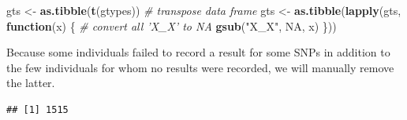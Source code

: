 \documentclass[]{article}
\newenvironment{Shaded}{\begin{snugshade}}{\end{snugshade}}
\newcommand{\KeywordTok}[1]{\textcolor[rgb]{0.13,0.29,0.53}{\textbf{#1}}}
\newcommand{\DataTypeTok}[1]{\textcolor[rgb]{0.13,0.29,0.53}{#1}}
\newcommand{\DecValTok}[1]{\textcolor[rgb]{0.00,0.00,0.81}{#1}}
\newcommand{\StringTok}[1]{\textcolor[rgb]{0.31,0.60,0.02}{#1}}
\newcommand{\CommentTok}[1]{\textcolor[rgb]{0.56,0.35,0.01}{\textit{#1}}}
\newcommand{\OtherTok}[1]{\textcolor[rgb]{0.56,0.35,0.01}{#1}}
\newcommand{\ControlFlowTok}[1]{\textcolor[rgb]{0.13,0.29,0.53}{\textbf{#1}}}
\newcommand{\OperatorTok}[1]{\textcolor[rgb]{0.81,0.36,0.00}{\textbf{#1}}}
\newcommand{\NormalTok}[1]{#1}
\begin{document}
\begin{Shaded}
\begin{Highlighting}[]
\NormalTok{gts <-}\StringTok{ }\KeywordTok{as.tibble}\NormalTok{(}\KeywordTok{t}\NormalTok{(gtypes)) }\CommentTok{# transpose data frame}
\NormalTok{gts <-}\StringTok{ }\KeywordTok{as.tibble}\NormalTok{(}\KeywordTok{lapply}\NormalTok{(gts, }\ControlFlowTok{function}\NormalTok{(x) \{ }\CommentTok{# convert all 'X_X' to NA}
  \KeywordTok{gsub}\NormalTok{(}\StringTok{"X_X"}\NormalTok{, }\OtherTok{NA}\NormalTok{, x)}
\NormalTok{\}))}
\end{Highlighting}
\end{Shaded}

Because some individuals failed to record a result for some SNPs in
addition to the few individuals for whom no results were recorded, we
will manually remove the latter.

\begin{Shaded}
\end{Shaded}

\begin{verbatim}
## [1] 1515
\end{verbatim}
\end{document}
